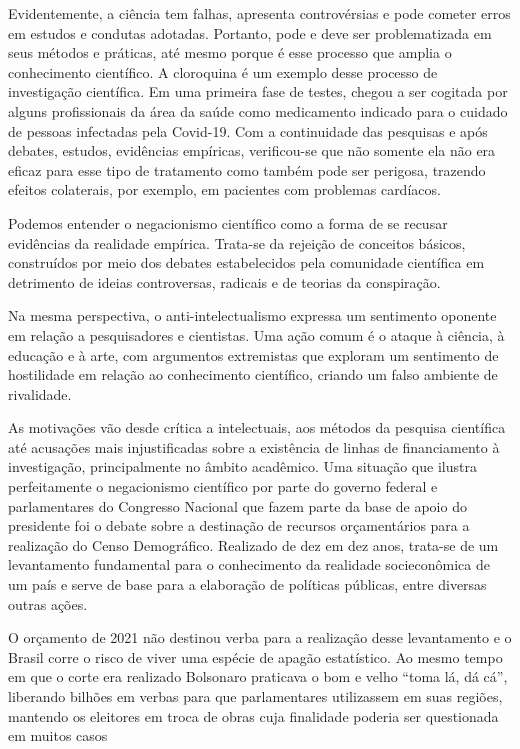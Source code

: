Evidentemente, a ciência tem falhas, apresenta controvérsias e pode
cometer erros em estudos e condutas adotadas. Portanto, pode e deve ser
problematizada em seus métodos e práticas, até mesmo porque é esse
processo que amplia o conhecimento científico. A cloroquina é um exemplo
desse processo de investigação científica. Em uma primeira fase de
testes, chegou a ser cogitada por alguns profissionais da área da saúde
como medicamento indicado para o cuidado de pessoas infectadas pela
Covid-19. Com a continuidade das pesquisas e após debates, estudos,
evidências empíricas, verificou-se que não somente ela não era eficaz
para esse tipo de tratamento como também pode ser perigosa, trazendo
efeitos colaterais, por exemplo, em pacientes com problemas cardíacos.

Podemos entender o negacionismo científico como a forma de se recusar
evidências da realidade empírica. Trata-se da rejeição de conceitos
básicos, construídos por meio dos debates estabelecidos pela comunidade
científica em detrimento de ideias controversas, radicais e de teorias
da conspiração.

Na mesma perspectiva, o anti-intelectualismo expressa um sentimento
oponente em relação a pesquisadores e cientistas. Uma ação comum é o
ataque à ciência, à educação e à arte, com argumentos extremistas que
exploram um sentimento de hostilidade em relação ao conhecimento
científico, criando um falso ambiente de rivalidade.

As motivações vão desde crítica a intelectuais, aos métodos da pesquisa
científica até acusações mais injustificadas sobre a existência de
linhas de financiamento à investigação, principalmente no âmbito
acadêmico. Uma situação que ilustra perfeitamente o negacionismo
científico por parte do governo federal e parlamentares do Congresso
Nacional que fazem parte da base de apoio do presidente foi o debate
sobre a destinação de recursos orçamentários para a realização do Censo
Demográfico. Realizado de dez em dez anos, trata-se de um levantamento
fundamental para o conhecimento da realidade socieconômica de um país e
serve de base para a elaboração de políticas públicas, entre diversas
outras ações.

O orçamento de 2021 não destinou verba para a realização desse
levantamento e o Brasil corre o risco de viver uma espécie de apagão
estatístico. Ao mesmo tempo em que o corte era realizado Bolsonaro
praticava o bom e velho ``toma lá, dá cá'', liberando bilhões em verbas
para que parlamentares utilizassem em suas regiões, mantendo os
eleitores em troca de obras cuja finalidade poderia ser questionada em
muitos casos

